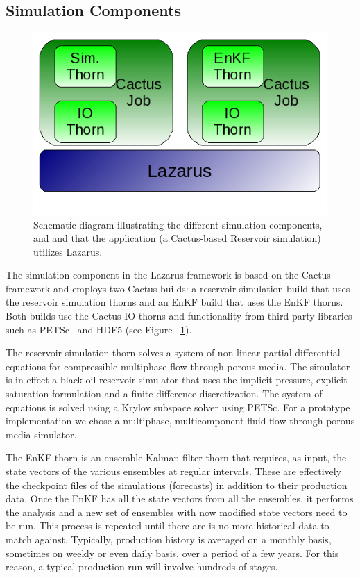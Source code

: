 \documentclass{sig-alternate}
\newcommand{\up}{\vspace*{-0.3em}}
\begin{document}
\subsection{Simulation Components}
\begin{figure}
\begin{center}
\includegraphics[scale=0.5]{./figures/Simulations.png}
\up\up\up\up\up\up
\caption{Schematic diagram illustrating the different simulation components, and and that the application (a Cactus-based Reservoir
  simulation) utilizes Lazarus.}\label{fig:application_usage} 
\up\up\up \up\up\up \up\up\up
\end{center} 
\end{figure}
 
The simulation component in the Lazarus framework is based on the Cactus framework and employs two Cactus builds: a reservoir simulation build that uses the reservoir simulation thorns and an EnKF build that uses the EnKF thorns. Both builds use the Cactus IO thorns and functionality from third party libraries such as PETSc~\cite{PETSc} and HDF5 (see Figure ~\ref{fig:application_usage}).


The reservoir simulation thorn solves a system of non-linear partial
differential equations for compressible multiphase flow through porous
media. The simulator is in effect a black-oil reservoir simulator that
uses the implicit-pressure, explicit-saturation formulation and a
finite difference discretization. The system of equations is solved
using a Krylov subspace solver using PETSc. For a prototype
implementation we chose a multiphase, multicomponent fluid flow
through porous media simulator.

The EnKF thorn is an ensemble Kalman filter thorn that requires, as input, the state vectors of the various ensembles at regular intervals. These are effectively the checkpoint files of the simulations (forecasts) in addition to their production data. Once the EnKF has all the state vectors from all the ensembles, it performs the analysis and a new set of ensembles with now modified state vectors need to be run. This process is repeated until there are is no more historical data to match against. Typically, production history is averaged on a monthly basis, sometimes on weekly or even daily basis, over a period of a few years. For this reason, a typical production run will involve hundreds of stages.
\end{document}
